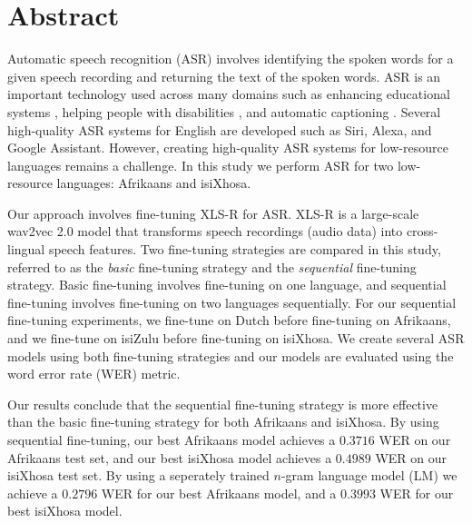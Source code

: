 \chapter*{Abstract}
\makeatletter{}\makeatother
Automatic speech recognition (ASR) involves identifying the spoken words for a given speech recording and returning the text of the spoken words.
ASR is an important technology used across many domains such as enhancing educational systems \cite{wald2005using}, 
helping people with disabilities \cite{terbeh2013automatic}, and automatic captioning \cite{wald2006captioning}.
Several high-quality ASR systems for English are developed such as Siri, Alexa, and Google Assistant.
However, creating high-quality ASR systems for low-resource languages remains a challenge.
In this study we perform ASR for two low-resource languages: Afrikaans and isiXhosa.

Our approach involves fine-tuning XLS-R for ASR.
XLS-R is a large-scale wav2vec 2.0 model that transforms speech recordings (audio data) into cross-lingual speech features.
Two fine-tuning strategies are compared in this study, referred to as the \emph{basic} fine-tuning strategy and the \emph{sequential} fine-tuning strategy.
Basic fine-tuning involves fine-tuning on one language, and sequential fine-tuning involves fine-tuning on two languages sequentially.
For our sequential fine-tuning experiments, we fine-tune on Dutch before fine-tuning on Afrikaans, and we fine-tune on isiZulu before fine-tuning on isiXhosa.
We create several ASR models using both fine-tuning strategies and our models are evaluated using the word error rate (WER) metric.

Our results conclude that the sequential fine-tuning strategy is more effective than the basic fine-tuning strategy for both Afrikaans and isiXhosa. 
By using sequential fine-tuning, our best Afrikaans model achieves a $0.3716$ WER on our Afrikaans test set, and our best isiXhosa model achieves a $0.4989$ WER on our isiXhosa test set.
By using a seperately trained $n$-gram language model (LM) we achieve a $0.2796$ WER for our best Afrikaans model, and a $0.3993$ WER for our best isiXhosa model.



